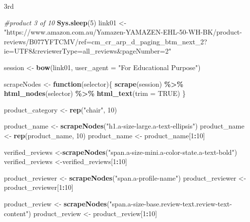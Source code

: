 \documentclass[
]{article}
\newenvironment{Shaded}{\begin{snugshade}}{\end{snugshade}}
\newcommand{\AttributeTok}[1]{\textcolor[rgb]{0.13,0.29,0.53}{#1}}
\newcommand{\CommentTok}[1]{\textcolor[rgb]{0.56,0.35,0.01}{\textit{#1}}}
\newcommand{\ConstantTok}[1]{\textcolor[rgb]{0.56,0.35,0.01}{#1}}
\newcommand{\ControlFlowTok}[1]{\textcolor[rgb]{0.13,0.29,0.53}{\textbf{#1}}}
\newcommand{\DecValTok}[1]{\textcolor[rgb]{0.00,0.00,0.81}{#1}}
\newcommand{\FunctionTok}[1]{\textcolor[rgb]{0.13,0.29,0.53}{\textbf{#1}}}
\newcommand{\NormalTok}[1]{#1}
\newcommand{\OtherTok}[1]{\textcolor[rgb]{0.56,0.35,0.01}{#1}}
\newcommand{\SpecialCharTok}[1]{\textcolor[rgb]{0.81,0.36,0.00}{\textbf{#1}}}
\newcommand{\StringTok}[1]{\textcolor[rgb]{0.31,0.60,0.02}{#1}}
\begin{document}
3rd

\begin{Shaded}
\begin{Highlighting}[]
\CommentTok{\#product 3 of 10}
   \FunctionTok{Sys.sleep}\NormalTok{(}\DecValTok{5}\NormalTok{)}
\NormalTok{link01 }\OtherTok{\textless{}{-}} \StringTok{"https://www.amazon.com.au/Yamazen{-}YAMAZEN{-}EHL{-}50{-}WH{-}BK/product{-}reviews/B077YFTCMV/ref=cm\_cr\_arp\_d\_paging\_btm\_next\_2?ie=UTF8\&reviewerType=all\_reviews\&pageNumber=2"}


\NormalTok{  session }\OtherTok{\textless{}{-}} \FunctionTok{bow}\NormalTok{(link01,}
               \AttributeTok{user\_agent =} \StringTok{"For Educational Purpose"}\NormalTok{)}

\NormalTok{  scrapeNodes }\OtherTok{\textless{}{-}} \ControlFlowTok{function}\NormalTok{(selector)\{}
    \FunctionTok{scrape}\NormalTok{(session) }\SpecialCharTok{\%\textgreater{}\%}
      \FunctionTok{html\_nodes}\NormalTok{(selector) }\SpecialCharTok{\%\textgreater{}\%}
      \FunctionTok{html\_text}\NormalTok{(}\AttributeTok{trim =} \ConstantTok{TRUE}\NormalTok{)}
\NormalTok{  \}}

\NormalTok{  product\_category }\OtherTok{\textless{}{-}} \FunctionTok{rep}\NormalTok{(}\StringTok{"chair"}\NormalTok{, }\DecValTok{10}\NormalTok{)}

\NormalTok{  product\_name }\OtherTok{\textless{}{-}} \FunctionTok{scrapeNodes}\NormalTok{(}\StringTok{"h1.a{-}size{-}large.a{-}text{-}ellipsis"}\NormalTok{)}
\NormalTok{  product\_name }\OtherTok{\textless{}{-}} \FunctionTok{rep}\NormalTok{(product\_name, }\DecValTok{10}\NormalTok{)}
\NormalTok{  product\_name }\OtherTok{\textless{}{-}}\NormalTok{ product\_name[}\DecValTok{1}\SpecialCharTok{:}\DecValTok{10}\NormalTok{]}
  
\NormalTok{  verified\_reviews }\OtherTok{\textless{}{-}}\FunctionTok{scrapeNodes}\NormalTok{(}\StringTok{"span.a{-}size{-}mini.a{-}color{-}state.a{-}text{-}bold"}\NormalTok{)}
\NormalTok{  verified\_reviews }\OtherTok{\textless{}{-}}\NormalTok{verified\_reviews[}\DecValTok{1}\SpecialCharTok{:}\DecValTok{10}\NormalTok{]}
  
\NormalTok{  product\_reviewer }\OtherTok{\textless{}{-}} \FunctionTok{scrapeNodes}\NormalTok{(}\StringTok{"span.a{-}profile{-}name"}\NormalTok{)}
\NormalTok{  product\_reviewer }\OtherTok{\textless{}{-}}\NormalTok{ product\_reviewer[}\DecValTok{1}\SpecialCharTok{:}\DecValTok{10}\NormalTok{]}
  
\NormalTok{  product\_review }\OtherTok{\textless{}{-}} \FunctionTok{scrapeNodes}\NormalTok{(}\StringTok{"span.a{-}size{-}base.review{-}text.review{-}text{-}content"}\NormalTok{)}
\NormalTok{  product\_review }\OtherTok{\textless{}{-}}\NormalTok{ product\_review[}\DecValTok{1}\SpecialCharTok{:}\DecValTok{10}\NormalTok{]}
  

\end{Highlighting}
\end{Shaded}
\end{document}
